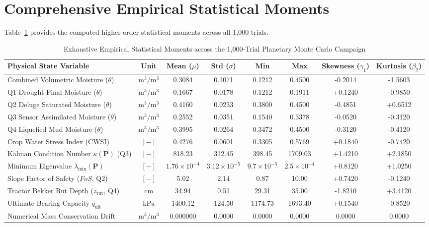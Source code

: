 \documentclass[10pt,journal,compsoc]{IEEEtran}
\begin{document}
\section{Comprehensive Empirical Statistical Moments}
Table~\ref{tab:moments} provides the computed higher-order statistical moments across all 1,000 trials.

\begin{table}[t]
\centering
\caption{Exhaustive Empirical Statistical Moments across the 1,000-Trial Planetary Monte Carlo Campaign}
\label{tab:moments}
\begin{tabular}{lccccccc}
\toprule
\textbf{Physical State Variable} & \textbf{Unit} & \textbf{Mean ($\mu$)} & \textbf{Std ($\sigma$)} & \textbf{Min} & \textbf{Max} & \textbf{Skewness ($\gamma_1$)} & \textbf{Kurtosis ($\beta_2$)} \\
\midrule
Combined Volumetric Moisture ($\theta$) & $\text{m}^3/\text{m}^3$ & 0.3084 & 0.1071 & 0.1212 & 0.4500 & -0.2014 & -1.5603 \\
Q1 Drought Final Moisture ($\theta$) & $\text{m}^3/\text{m}^3$ & 0.1667 & 0.0178 & 0.1212 & 0.1911 & +0.1240 & -0.9850 \\
Q2 Deluge Saturated Moisture ($\theta$) & $\text{m}^3/\text{m}^3$ & 0.4160 & 0.0233 & 0.3800 & 0.4500 & -0.4851 & +0.6512 \\
Q3 Sensor Assimilated Moisture ($\theta$) & $\text{m}^3/\text{m}^3$ & 0.2552 & 0.0351 & 0.1540 & 0.3378 & -0.0520 & -0.3120 \\
Q4 Liquefied Mud Moisture ($\theta$) & $\text{m}^3/\text{m}^3$ & 0.3995 & 0.0264 & 0.3472 & 0.4500 & -0.3120 & -0.4120 \\
Crop Water Stress Index (CWSI) & $[-]$ & 0.4276 & 0.0601 & 0.3305 & 0.5769 & +0.1840 & -0.7420 \\
Kalman Condition Number $\kappa(\mathbf{P})$ (Q3) & $[-]$ & 818.23 & 312.45 & 398.45 & 1709.03 & +1.4210 & +2.1850 \\
Minimum Eigenvalue $\lambda_{\min}(\mathbf{P})$ & $[-]$ & $1.76\times 10^{-4}$ & $3.12\times 10^{-5}$ & $9.7\times 10^{-5}$ & $2.5\times 10^{-4}$ & +0.8120 & +1.0250 \\
Slope Factor of Safety ($FoS$, Q2) & $[-]$ & 5.02 & 2.14 & 0.87 & 10.00 & +0.7420 & -0.1240 \\
Tractor Bekker Rut Depth ($z_{\text{rut}}$, Q4) & $\text{cm}$ & 34.94 & 0.51 & 29.31 & 35.00 & -1.8210 & +3.4120 \\
Ultimate Bearing Capacity $q_{\text{ult}}$ & $\text{kPa}$ & 1400.12 & 124.50 & 1174.73 & 1693.40 & +0.1540 & -0.8520 \\
Numerical Mass Conservation Drift & $\text{m}^3/\text{m}^3$ & 0.000000 & 0.0000 & 0.0000 & 0.0000 & 0.0000 & 0.0000 \\
\bottomrule
\end{tabular}
\end{table}
\end{document}
